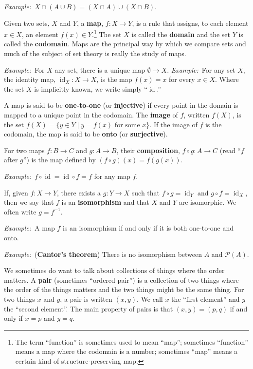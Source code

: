 \documentclass[10pt, a4paper, twocolumn]{article}
\newcommand{\defn}[1]{\textbf{#1}}
\newcommand{\eg}{\emph{Example:}\relax}
\DeclareMathOperator{\id}{id}
\begin{document}
\eg\ $X\cap(A\cup B) = (X\cap A)\cup (X\cap B)$.

Given two sets, $X$ and $Y$, a \defn{map}, $f : X \to Y$, is a rule that assigns,
to each element $x \in X$, an element $f(x) \in Y$.\footnote{The term “function” is
  sometimes used to mean “map”; sometimes “function” means a map where the
  codomain is a number; sometimes “map” means a certain kind of
  structure-preserving map.} The set $X$ is called the \defn{domain} and the set
$Y$ is called the \defn{codomain}. Maps are the principal way by which we
compare sets and much of the subject of set theory is really the study of maps.

\eg\ For $X$ any set, there is a unique map $\emptyset \to X$.
\eg\ For any set $X$, the
identity map, $\id_X : X \to X$, is the map $f(x) = x$ for every
$x\in X$. Where the set $X$ is implicitly known, we write simply “$\id$.” 

A map is said to be \defn{one-to-one} (or \defn{injective}) if every point in
the domain is mapped to a unique point in the codomain. The \defn{image} of $f$,
written $f(X)$, is the set $f(X) = \{y \in Y \mid \text{$y = f(x)$ for some
  $x$}\}$. If the image of $f$ is the codomain, the map is said to be \defn{onto} (or \defn{surjective}). 

For two maps $f:B \to C$ and $g:A \to B$, their \defn{composition}, $f\circ g: A \to C$
(read “$f$ after $g$”) is the map defined by $(f\circ g)(x) = f(g(x))$.

\eg\ $f\circ\id = \id\circ f = f$ for any map $f$. 

If, given $f:X \to Y$, there exists a $g:Y \to X$ such that $f\circ g = \id_Y$ and $g\circ f
= \id_X$, then we say that $f$ is an \defn{isomorphism} and that $X$ and $Y$ are
isomorphic. We often write $g = f^{-1}$.

\eg\ A map $f$ is an isomorphism if and only if it is both one-to-one and onto. 

\eg\ (\defn{Cantor's theorem}) There is no isomorphism between $A$ and $\mathcal{P}(A)$. 

We sometimes do want to talk about collections of things where the order
matters. A \defn{pair} (sometimes “ordered pair”) is a collection of two things
where the order of the things matters and the two things might be the same
thing. For two things $x$ and $y$, a pair is written $(x, y)$. We call $x$ the
“first element” and $y$ the “second element”. The main property of pairs is that
$(x,y)=(p,q)$ if and only if $x=p$ and $y=q$.
\end{document}
